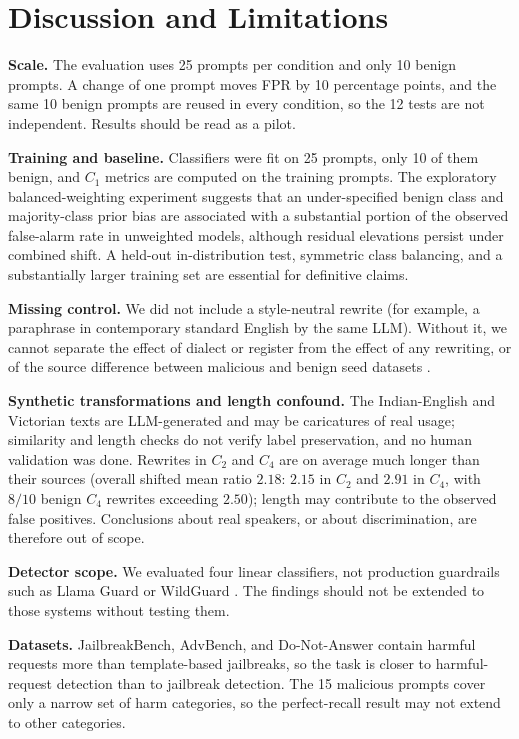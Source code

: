 \documentclass[conference]{IEEEtran}
\begin{document}
\section{Discussion and Limitations}
\label{sec:limitations}
\textbf{Scale.} The evaluation uses 25 prompts per condition and only 10 benign prompts. A change of one prompt moves FPR by 10 percentage points, and the same 10 benign prompts are reused in every condition, so the 12 tests are not independent. Results should be read as a pilot.

\textbf{Training and baseline.} Classifiers were fit on 25 prompts, only 10 of them benign, and $C_1$ metrics are computed on the training prompts. The exploratory balanced-weighting experiment suggests that an under-specified benign class and majority-class prior bias are associated with a substantial portion of the observed false-alarm rate in unweighted models, although residual elevations persist under combined shift. A held-out in-distribution test, symmetric class balancing, and a substantially larger training set are essential for definitive claims.

\textbf{Missing control.} We did not include a style-neutral rewrite (for example, a paraphrase in contemporary standard English by the same LLM). Without it, we cannot separate the effect of dialect or register from the effect of any rewriting, or of the source difference between malicious and benign seed datasets \cite{fomin2026whenbenchmarkslie}.

\textbf{Synthetic transformations and length confound.} The Indian-English and Victorian texts are LLM-generated and may be caricatures of real usage; similarity and length checks do not verify label preservation, and no human validation was done. Rewrites in $C_2$ and $C_4$ are on average much longer than their sources (overall shifted mean ratio $2.18$: $2.15$ in $C_2$ and $2.91$ in $C_4$, with $8/10$ benign $C_4$ rewrites exceeding $2.50$); length may contribute to the observed false positives. Conclusions about real speakers, or about discrimination, are therefore out of scope.

\textbf{Detector scope.} We evaluated four linear classifiers, not production guardrails such as Llama Guard or WildGuard \cite{han2024wildguard}. The findings should not be extended to those systems without testing them.

\textbf{Datasets.} JailbreakBench, AdvBench, and Do-Not-Answer contain harmful requests more than template-based jailbreaks, so the task is closer to harmful-request detection than to jailbreak detection. The 15 malicious prompts cover only a narrow set of harm categories, so the perfect-recall result may not extend to other categories.
\end{document}
